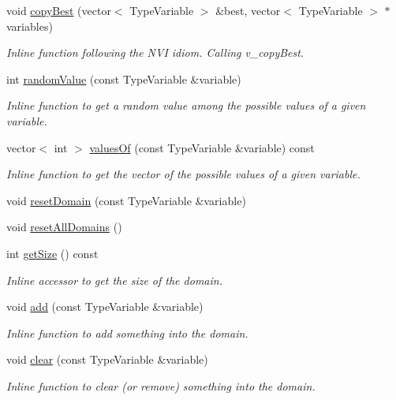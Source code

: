\begin{DoxyCompactItemize}
void \hyperlink{classghost_1_1Domain_a41fb1e24ed9006a10a2eb14cc262b2d2}{copy\-Best} (vector$<$ Type\-Variable $>$ \&best, vector$<$ Type\-Variable $>$ $\ast$variables)
\begin{DoxyCompactList}\small\item\em Inline function following the N\-V\-I idiom. Calling v\-\_\-copy\-Best. \end{DoxyCompactList}\item 
int \hyperlink{classghost_1_1Domain_abd3f0bd85c98e66c025e0ff3532af8dd}{random\-Value} (const Type\-Variable \&variable)
\begin{DoxyCompactList}\small\item\em Inline function to get a random value among the possible values of a given variable. \end{DoxyCompactList}\item 
vector$<$ int $>$ \hyperlink{classghost_1_1Domain_a5d4e6a323e4c3c14bc1da5ddbd5af55d}{values\-Of} (const Type\-Variable \&variable) const 
\begin{DoxyCompactList}\small\item\em Inline function to get the vector of the possible values of a given variable. \end{DoxyCompactList}\item 
void \hyperlink{classghost_1_1Domain_a2165237b435a5cb4dfd8584680fcfe05}{reset\-Domain} (const Type\-Variable \&variable)
\item 
void \hyperlink{classghost_1_1Domain_aa014a06ba46e4e057ed182d328a72e97}{reset\-All\-Domains} ()
\item 
int \hyperlink{classghost_1_1Domain_af6950190ced9110a04bde5321337d14d}{get\-Size} () const 
\begin{DoxyCompactList}\small\item\em Inline accessor to get the size of the domain. \end{DoxyCompactList}\item 
void \hyperlink{classghost_1_1Domain_aa9386317ee6ca064d1e2018acefaf8bb}{add} (const Type\-Variable \&variable)
\begin{DoxyCompactList}\small\item\em Inline function to add something into the domain. \end{DoxyCompactList}\item 
void \hyperlink{classghost_1_1Domain_ad3b39f88a7becd7c8c347c04963e3414}{clear} (const Type\-Variable \&variable)
\begin{DoxyCompactList}\small\item\em Inline function to clear (or remove) something into the domain. \end{DoxyCompactList}\end{DoxyCompactItemize}
